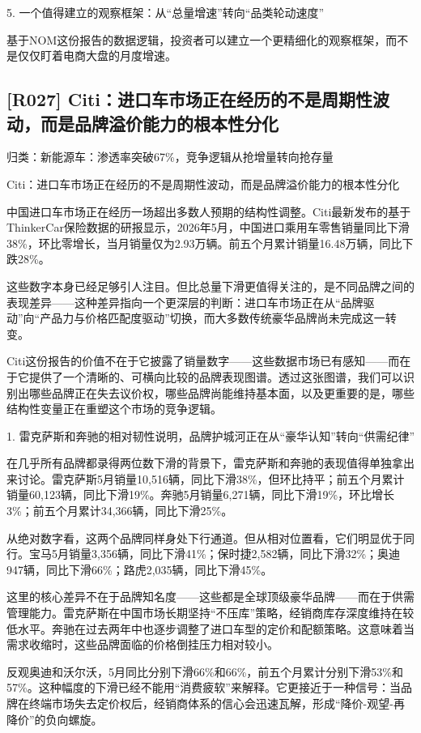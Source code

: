 \documentclass[11pt]{ctexart}
\begin{document}
5. 一个值得建立的观察框架：从“总量增速”转向“品类轮动速度”

基于NOM这份报告的数据逻辑，投资者可以建立一个更精细化的观察框架，而不是仅仅盯着电商大盘的月度增速。

\subsection{[R027] Citi：进口车市场正在经历的不是周期性波动，而是品牌溢价能力的根本性分化}
{\small\color{refgray}归类：新能源车：渗透率突破67\%，竞争逻辑从抢增量转向抢存量}

Citi：进口车市场正在经历的不是周期性波动，而是品牌溢价能力的根本性分化

中国进口车市场正在经历一场超出多数人预期的结构性调整。Citi最新发布的基于ThinkerCar保险数据的研报显示，2026年5月，中国进口乘用车零售销量同比下滑38\%，环比零增长，当月销量仅为2.93万辆。前五个月累计销量16.48万辆，同比下跌28\%。

这些数字本身已经足够引人注目。但比总量下滑更值得关注的，是不同品牌之间的表现差异——这种差异指向一个更深层的判断：进口车市场正在从“品牌驱动”向“产品力与价格匹配度驱动”切换，而大多数传统豪华品牌尚未完成这一转变。

Citi这份报告的价值不在于它披露了销量数字——这些数据市场已有感知——而在于它提供了一个清晰的、可横向比较的品牌表现图谱。透过这张图谱，我们可以识别出哪些品牌正在失去议价权，哪些品牌尚能维持基本面，以及更重要的是，哪些结构性变量正在重塑这个市场的竞争逻辑。

1. 雷克萨斯和奔驰的相对韧性说明，品牌护城河正在从“豪华认知”转向“供需纪律”

在几乎所有品牌都录得两位数下滑的背景下，雷克萨斯和奔驰的表现值得单独拿出来讨论。雷克萨斯5月销量10,516辆，同比下滑38\%，但环比持平；前五个月累计销量60,123辆，同比下滑19\%。奔驰5月销量6,271辆，同比下滑19\%，环比增长3\%；前五个月累计34,366辆，同比下滑25\%。

从绝对数字看，这两个品牌同样身处下行通道。但从相对位置看，它们明显优于同行。宝马5月销量3,356辆，同比下滑41\%；保时捷2,582辆，同比下滑32\%；奥迪947辆，同比下滑66\%；路虎2,035辆，同比下滑45\%。

这里的核心差异不在于品牌知名度——这些都是全球顶级豪华品牌——而在于供需管理能力。雷克萨斯在中国市场长期坚持“不压库”策略，经销商库存深度维持在较低水平。奔驰在过去两年中也逐步调整了进口车型的定价和配额策略。这意味着当需求收缩时，这些品牌面临的价格倒挂压力相对较小。

反观奥迪和沃尔沃，5月同比分别下滑66\%和66\%，前五个月累计分别下滑53\%和57\%。这种幅度的下滑已经不能用“消费疲软”来解释。它更接近于一种信号：当品牌在终端市场失去定价权后，经销商体系的信心会迅速瓦解，形成“降价-观望-再降价”的负向螺旋。
\end{document}
